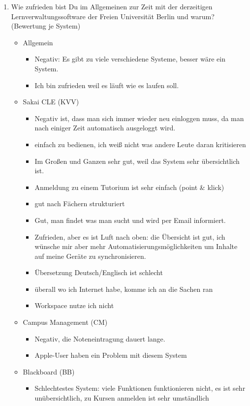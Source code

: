 \documentclass{article}
\begin{document}
\begin{enumerate}
\item Wie zufrieden bist Du im Allgemeinen zur Zeit mit der derzeitigen Lernverwaltungssoftware der Freien Universität Berlin und warum? (Bewertung je System)
\begin{itemize}
\item Allgemein
\begin{itemize}
\item Negativ: Es gibt zu viele verschiedene Systeme, besser wäre ein System.
\item Ich bin zufrieden weil es läuft wie es laufen soll.
\end{itemize}
\item Sakai CLE (KVV)
\begin{itemize}
\item Negativ ist, dass man sich immer wieder neu einloggen muss, da man nach einiger Zeit automatisch ausgeloggt wird.
\item einfach zu bedienen, ich weiß nicht was andere Leute daran kritisieren
\item Im Großen und Ganzen sehr gut, weil das System sehr übersichtlich ist.
\item Anmeldung zu einem Tutorium ist sehr einfach (point \& klick)
\item gut nach Fächern strukturiert
\item Gut, man findet was man sucht und wird per Email informiert.
\item Zufrieden, aber es ist Luft nach oben: die Übersicht ist gut, ich wünsche mir aber mehr Automatisierungsmöglichkeiten um Inhalte auf meine Geräte zu synchronisieren.
\item Übersetzung Deutsch/Englisch ist schlecht
\item überall wo ich Internet habe, komme ich an die Sachen ran
\item Workspace nutze ich nicht
\end{itemize}
\item Campus Management (CM)
\begin{itemize}
\item Negativ, die Noteneintragung dauert lange.
\item Apple-User haben ein Problem mit diesem System
\end{itemize}
\item Blackboard (BB)
\begin{itemize}
\item Schlechtestes System: viele Funktionen funktionieren nicht, es ist sehr unübersichtlich, zu Kursen anmelden ist sehr umständlich
\end{itemize}
\end{itemize}


\end{enumerate}
\end{document}
